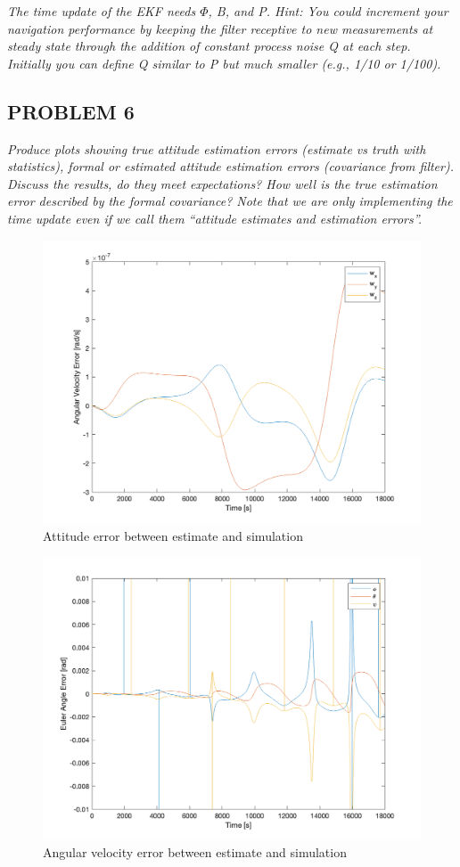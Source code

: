 \textit{The time update of the EKF needs $\Phi$, B, and P. Hint: You could increment your navigation performance by keeping the filter receptive to new measurements at steady state through the addition of constant process noise Q at each step. Initially you can define Q similar to P but much smaller (e.g., 1/10 or 1/100).}

\subsection{PROBLEM 6}
\textit{Produce plots showing true attitude estimation errors (estimate vs truth with statistics), formal or estimated attitude estimation errors (covariance from filter). Discuss the results, do they meet expectations? How well is the true estimation error described by the formal covariance? Note that we are only implementing the time update even if we call them “attitude estimates and estimation errors”.}

\begin{figure}[H]
\centering
\includegraphics[scale=0.6]{Images/ps7_problem6_angvel_err.png}
\caption{Attitude error between estimate and simulation}
\label{fig:ps7_problem5a_angvel_sim}
\end{figure}

\begin{figure}[H]
\centering
\includegraphics[scale=0.6]{Images/ps7_problem6_angle_err.png}
\caption{Angular velocity error between estimate and simulation}
\label{fig:ps7_problem5a_angvel_sim}
\end{figure}